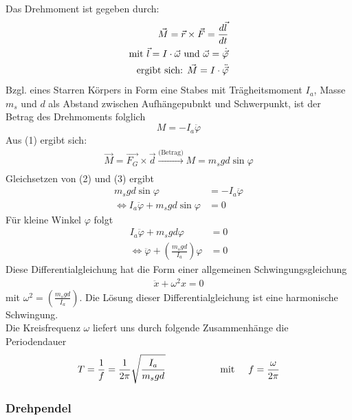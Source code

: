 \documentclass[11pt,a4paper]{article}
\begin{document}
       Das Drehmoment ist gegeben durch:
      \begin{align}
      	\vec{M} = \vec{r}\times\vec{F} = \frac{{d\vec{l}}}{dt} \\
      	\text{mit         }        \vec{l} = I \cdot \vec{\omega} \text{  und  }  \vec{\omega} = \dot{\vec{\varphi}} \notag\\
      	\text{ergibt sich:   }  \vec{M} = I \cdot \ddot{\vec\varphi}\notag
      	  \end{align}
Bzgl. eines Starren Körpers in Form eine Stabes mit Trägheitsmoment $I_a$, Masse $m_s$ und $d$ als Abstand zwischen Aufhängepubnkt und Schwerpunkt, ist der Betrag des Drehmoments folglich
\begin{equation}
		M =- I_a \ddot{\varphi}
\end{equation}
        Aus (1) ergibt sich:
\begin{align}
 		\vec{M}= \vec{F_G} \times \vec{d} \overset{\text{(Betrag)}}{\underset{\text{ }}{\rightarrow}} M = m_sgd \sin\varphi
\end{align}
Gleichsetzen von (2) und (3) ergibt
\begin{align*}
		 m_sgd \sin\varphi&= - I_a \ddot{\varphi} \\
 		\Leftrightarrow I_a \ddot{\varphi} + m_sgd \sin\varphi&= 0
\end{align*}
Für kleine Winkel $\varphi$ folgt
\begin{align*}
		I_a \ddot{\varphi} + m_sgd \varphi&= 0\\
		 \Leftrightarrow \ddot\varphi + \left(\frac{m_sgd}{I_a}\right)\varphi &= 0
	\end{align*}
Diese Differentialgleichung hat die Form einer allgemeinen Schwingungsgleichung
\begin{align*}
	\ddot{x}+\omega^2 x = 0
\end{align*}
mit $\omega^2 = \left(\frac{m_sgd}{I_a}\right)$. Die Lösung dieser Differentialgleichung ist eine harmonische Schwingung.\\
Die Kreisfrequenz $\omega$ liefert uns durch folgende Zusammenhänge die Periodendauer
\begin{equation*}
	T = \frac{1}{f} = \frac{1}{2\pi}\sqrt{\frac{I_a}{m_sgd}} \hspace{2cm} \text{mit}\hspace{0.5cm}   f=\frac{\omega}{2\pi}
\end{equation*}




	
       \subsubsection{Drehpendel}
       
\end{document}
